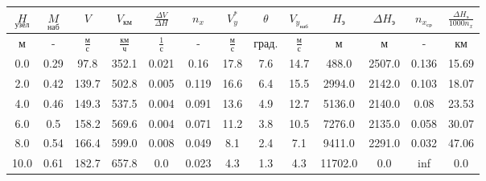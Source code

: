 \begin{tabular}{|c|c|c|c|c|c|c|c|c|c|c|c|c|}
\hline
$\underset{узел}{H}$ & $\underset{наб}{M}$ & $V$ & $V_{км}$ & $\frac{\Delta V}{\Delta H}$ & $n_x$ & $V_{y}^*$ & $\theta$ & $V_{y_{наб}}$ & $H_э$ & $\Delta H_э$ & $n_{x_{ср}}$ & $\frac{\Delta H_{э}}{1000 n_x}$ \\ 
\hline
м & - & $\frac{м}{с}$ & $\frac{км}{ч}$ & $\frac{1}{с}$ & - & $\frac{м}{с}$ & $град.$ & $\frac{м}{с}$ & м & м & - & км \\ 
\hline
0.0 & 0.29 & 97.8 & 352.1 & 0.021 & 0.16 & 17.8 & 7.6 & 14.7 & 488.0 & 2507.0 & 0.136 & 15.69 \\ 
\hline
2.0 & 0.42 & 139.7 & 502.8 & 0.005 & 0.119 & 16.6 & 6.4 & 15.5 & 2994.0 & 2142.0 & 0.103 & 18.07 \\ 
\hline
4.0 & 0.46 & 149.3 & 537.5 & 0.004 & 0.091 & 13.6 & 4.9 & 12.7 & 5136.0 & 2140.0 & 0.08 & 23.53 \\ 
\hline
6.0 & 0.5 & 158.2 & 569.6 & 0.004 & 0.071 & 11.2 & 3.8 & 10.5 & 7276.0 & 2135.0 & 0.058 & 30.07 \\ 
\hline
8.0 & 0.54 & 166.4 & 599.0 & 0.008 & 0.049 & 8.1 & 2.4 & 7.1 & 9411.0 & 2291.0 & 0.032 & 47.06 \\ 
\hline
10.0 & 0.61 & 182.7 & 657.8 & 0.0 & 0.023 & 4.3 & 1.3 & 4.3 & 11702.0 & 0.0 & inf & 0.0 \\ 
\hline
\end{tabular}